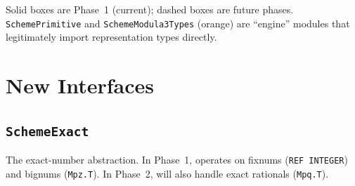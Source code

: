 \documentclass[12pt]{article}
\begin{document}
\noindent Solid boxes are Phase~1 (current); dashed boxes are
future phases.  {\tt SchemePrimitive} and {\tt SchemeModula3Types}
(orange) are ``engine'' modules that legitimately import
representation types directly.

\section{New Interfaces}
\label{sec:interfaces}

\subsection{{\tt SchemeExact}}
\label{sec:iface-exact}

The exact-number abstraction.  In Phase~1, operates on fixnums
({\tt REF INTEGER}) and bignums ({\tt Mpz.T}).  In Phase~2, will
also handle exact rationals ({\tt Mpq.T}).
\end{document}

